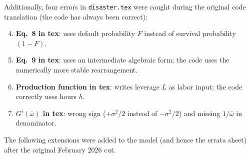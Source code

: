 \documentclass[11pt]{article}
\begin{document}
Additionally, four errors in \texttt{disaster.tex} were caught during
the original code translation (the code has always been correct):

\begin{enumerate}
\setcounter{enumi}{3}
\item \textbf{Eq.~8 in tex}: uses default probability $F$ instead of
  survival probability $(1-F)$.

\item \textbf{Eq.~9 in tex}: uses an intermediate algebraic form; the
  code uses the numerically more stable rearrangement.

\item \textbf{Production function in tex}: writes leverage $L$ as labor
  input; the code correctly uses hours $h$.

\item \textbf{$G'(\bar\omega)$ in tex}: wrong sign ($+\sigma^2/2$
  instead of $-\sigma^2/2$) and missing $1/\bar\omega$ in denominator.
\end{enumerate}

\bigskip\noindent
The following extensions were added to the model (and hence the errata
sheet) after the original February 2026 cut.
\end{document}
